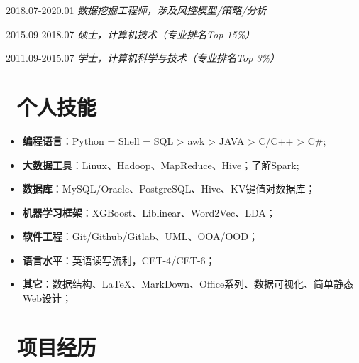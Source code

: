 \documentclass{resume}
\begin{document}
         {2018.07-2020.01}
   \faUserMd   \textit{   数据挖掘工程师，涉及风控模型/策略/分析 }

                                         {2015.09-2018.07}
   \faGraduationCap   \textit{  硕士，计算机技术（专业排名Top 15\%） }

         {2011.09-2015.07}
   \faGraduationCap   \textit{  学士，计算机科学与技术（专业排名Top 3\%） }

\medskip










\section{   \faCogs    \  个人技能}

\begin{itemize}  [parsep=0.5ex]

   \item   \textbf{编程语言}：Python = Shell = SQL > awk > JAVA > C/C++ > C\#;
   \item    \textbf{大数据工具}：Linux、Hadoop、MapReduce、Hive；了解Spark;
   \item    \textbf{数据库}：MySQL/Oracle、PostgreSQL、Hive、KV键值对数据库；
   \item    \textbf{机器学习框架}：XGBoost、Liblinear、Word2Vec、LDA；
   \item    \textbf{软件工程}：Git/Github/Gitlab、UML、OOA/OOD；
   \item    \textbf{语言水平}：英语读写流利，CET-4/CET-6；
   \item    \textbf{其它}：数据结构、LaTeX、MarkDown、Office系列、数据可视化、简单静态Web设计；
 
\end{itemize}

\medskip










\section{   \faUsers    \ 项目经历}
\end{document}
